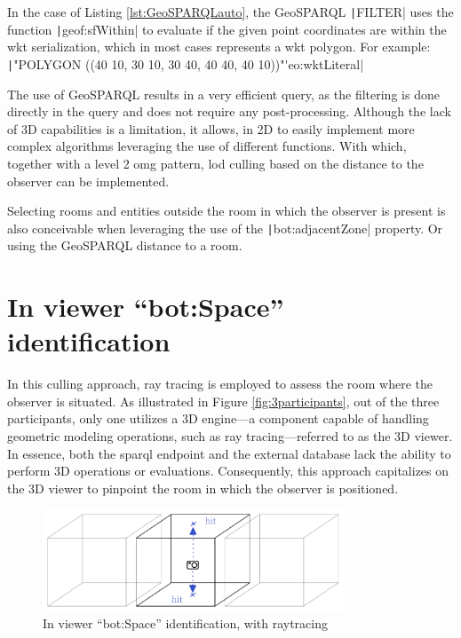 In the case of Listing \ref{lst:GeoSPARQLauto}, the GeoSPARQL \texttt|FILTER| uses the function \texttt|geof:sfWithin| to evaluate if the given point coordinates are within the \ac{wkt} serialization, which in most cases represents a \ac{wkt} polygon. For example:\\
\texttt|"POLYGON ((40 10, 30 10, 30 40, 40 40, 40 10))"^^geo:wktLiteral|

The use of GeoSPARQL results in a very efficient query, as the filtering is done directly in the query and does not require any post-processing. Although the lack of 3D capabilities is a limitation, it allows, in 2D to easily implement more complex algorithms leveraging the use of different functions. With which, together with a level 2 \ac{omg} pattern, \ac{lod} culling based on the distance to the observer can be implemented.

Selecting rooms and entities outside the room in which the observer is present is also conceivable when leveraging the use of the \texttt|bot:adjacentZone| property. Or using the GeoSPARQL distance to a room.

\section{In viewer \enquote{bot:Space} identification} \label{sec:inViewer}
In this culling approach, ray tracing is employed to assess the room where the observer is situated. As illustrated in Figure \ref{fig:3participants}, out of the three participants, only one utilizes a 3D engine—a component capable of handling geometric modeling operations, such as ray tracing—referred to as the 3D viewer. In essence, both the \ac{sparql} endpoint and the external database lack the ability to perform 3D operations or evaluations. Consequently, this approach capitalizes on the 3D viewer to pinpoint the room in which the observer is positioned.

\begin{figure}[H]
    \centering
    \includegraphics[width=0.8\textwidth]{figures/pdf/inViewer.pdf}
    \caption{In viewer \enquote{bot:Space} identification, with raytracing}
    \label{fig:raytrace}
\end{figure}

